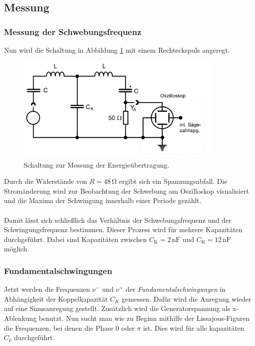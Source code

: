 \subsection{Messung}
\subsubsection*{Messung der Schwebungsfrequenz}

Nun wird die Schaltung in Abbildung \ref{fig:schwebeschaltung} mit einem Rechteckspuls angeregt.

\begin{figure} 
    \centering
    \includegraphics[width=10cm] {pictures/schwebeschaltung.png} 
    \caption{Schaltung zur Messung der Energieübertragung. \cite{v355}}
    \label{fig:schwebeschaltung}
\end{figure} 

Durch die Widerstände von $R = 48 \,\unit{\ohm}$ ergibt sich ein Spannungsabfall.
Die Stromänderung wird zur Beobachtung der Schwebung am Oszilloskop visualisiert und
die Maxima der Schwingung innerhalb einer Periode gezählt.\\
\\
Damit lässt sich schließlich das Verhältnis der Schwebungsfrequenz und der Schwingungsfrequenz bestimmen.
Dieser Prozess wird für mehrere Kapazitäten durchgeführt.
Dabei sind Kapazitäten zwischen $C_{\text{K}} = 2 \,\unit{\nano\farad}$ und $C_{\text{K}} = 12 \,\unit{\nano\farad}$ möglich.


\subsubsection*{Fundamentalschwingungen}

Jetzt werden die Frequenzen $\nu^{-}$ und $\nu^{+}$ der \textit{Fundamentalschwingungen} in 
Abhängigkeit der Koppelkapazität $C_{K}$ gemessen.
Dafür wird die Anregung wieder auf eine Sinusanregung gestellt.
Zusätzlich wird die Generatorspannung als x-Ablenkung benutzt.
Nun sucht man wie zu Beginn mithilfe der Lissajous-Figuren die Frequenzen, bei denen die Phase 0 oder $\pi$ ist.
Dies wird für alle kapazitäten $C_{k}$ durchgeführt.


